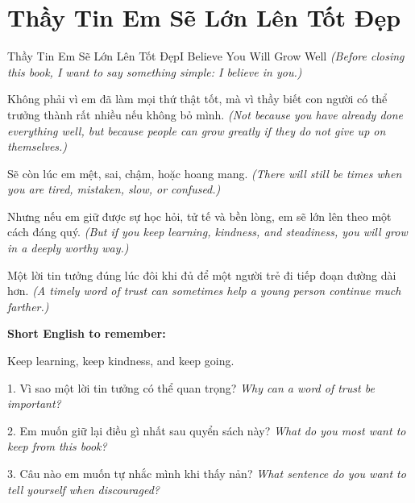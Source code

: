 \section{Thầy Tin Em Sẽ Lớn Lên Tốt Đẹp}
\begin{truyen}{Thầy Tin Em Sẽ Lớn Lên Tốt Đẹp}{I Believe You Will Grow Well}
\textit{(Before closing this book, I want to say something simple: I believe in you.)}

Không phải vì em đã làm mọi thứ thật tốt, mà vì thầy biết con người có thể trưởng thành rất nhiều nếu không bỏ mình.
\textit{(Not because you have already done everything well, but because people can grow greatly if they do not give up on themselves.)}

Sẽ còn lúc em mệt, sai, chậm, hoặc hoang mang.
\textit{(There will still be times when you are tired, mistaken, slow, or confused.)}

Nhưng nếu em giữ được sự học hỏi, tử tế và bền lòng, em sẽ lớn lên theo một cách đáng quý.
\textit{(But if you keep learning, kindness, and steadiness, you will grow in a deeply worthy way.)}
\end{truyen}

\begin{baihoc}
Một lời tin tưởng đúng lúc đôi khi đủ để một người trẻ đi tiếp đoạn đường dài hơn.
\textit{(A timely word of trust can sometimes help a young person continue much farther.)}
\end{baihoc}

\begin{ghinhoanh}
\textbf{Short English to remember:}

Keep learning, keep kindness, and keep going.

\end{ghinhoanh}

\begin{tuhocnhanh}
1. Vì sao một lời tin tưởng có thể quan trọng? \textit{Why can a word of trust be important?}

2. Em muốn giữ lại điều gì nhất sau quyển sách này? \textit{What do you most want to keep from this book?}

3. Câu nào em muốn tự nhắc mình khi thấy nản? \textit{What sentence do you want to tell yourself when discouraged?}
\end{tuhocnhanh}
\ngancach
